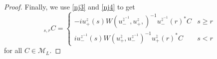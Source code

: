 \documentclass[10pt,a4paper]{amsart}
\begin{document}
\begin{proof}
Finally, we use  \eqref{nj3} and \eqref{nj4} to get
 \begin{equation}
    [R_{H}(E)]_{s,r}C=
 \left\{ \begin{array}{lcc}
             -iu_{+}^{z}(s) W(u_{-}^{\overline{z}^{-1}},u_{+}^{z},)^{-1} u_{-}^{\overline{z}^{-1}}(r)^{*}C &   s\geq r \\
            iu_{-}^{z^{-1}}(s) W(u_{+}^{\overline{z}}, u_{-}^{z^{-1}})^{-1} u_{+}^{\overline{z}}(r)^{*}C &  s< r
             \end{array}
   \right.
   \end{equation}  for all $C\in \mathcal{M}_L.$
\end{proof}
\end{document}
